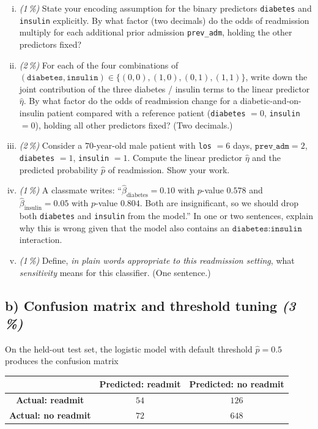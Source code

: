 \documentclass[11pt,a4paper]{article}
\newcommand{\subpoints}[1]{\textit{(#1\,\%)}}
\begin{document}
\begin{enumerate}[(i)]
  \item \subpoints{1} State your encoding assumption for the binary predictors \texttt{diabetes} and \texttt{insulin} explicitly. By what factor (two decimals) do the odds of readmission multiply for each additional prior admission \texttt{prev\_adm}, holding the other predictors fixed?
  \item \subpoints{2} For each of the four combinations of $(\texttt{diabetes}, \texttt{insulin}) \in \{(0,0), (1,0), (0,1), (1,1)\}$, write down the joint contribution of the three diabetes / insulin terms to the linear predictor $\hat\eta$. By what factor do the odds of readmission change for a diabetic-and-on-insulin patient compared with a reference patient (\texttt{diabetes} $= 0$, \texttt{insulin} $= 0$), holding all other predictors fixed? (Two decimals.)
  \item \subpoints{2} Consider a $70$-year-old male patient with \texttt{los} $= 6$ days, $\texttt{prev\_adm} = 2$, \texttt{diabetes} $= 1$, \texttt{insulin} $= 1$. Compute the linear predictor $\hat\eta$ and the predicted probability $\hat p$ of readmission. Show your work.
  \item \subpoints{1} A classmate writes: ``$\hat\beta_{\text{diabetes}} = 0.10$ with $p$-value $0.578$ and $\hat\beta_{\text{insulin}} = 0.05$ with $p$-value $0.804$. Both are insignificant, so we should drop both \texttt{diabetes} and \texttt{insulin} from the model.'' In one or two sentences, explain why this is wrong given that the model also contains an $\texttt{diabetes}\!:\!\texttt{insulin}$ interaction.
  \item \subpoints{1} Define, \emph{in plain words appropriate to this readmission setting}, what \emph{sensitivity} means for this classifier. (One sentence.)
\end{enumerate}

\subsection*{b) Confusion matrix and threshold tuning \subpoints{3}}

On the held-out test set, the logistic model with default threshold $\hat p = 0.5$ produces the confusion matrix

\begin{center}\small
\begin{tabular}{c|cc}
 & \textbf{Predicted: readmit} & \textbf{Predicted: no readmit} \\ \hline
\textbf{Actual: readmit}    & $54$  & $126$ \\
\textbf{Actual: no readmit} & $72$  & $648$ \\
\end{tabular}
\end{center}
\end{document}
